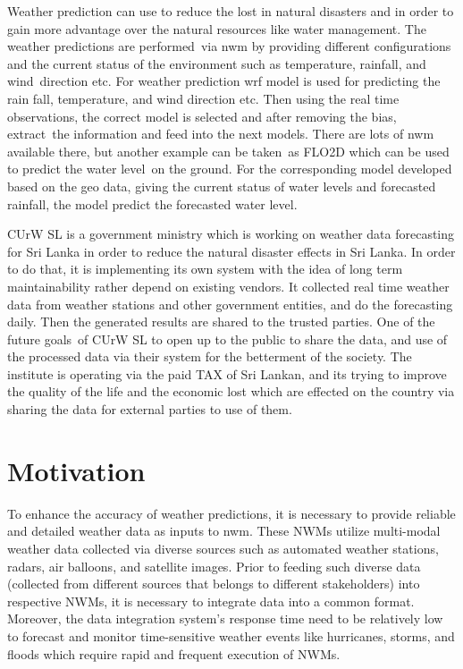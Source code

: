 Weather prediction can use to reduce the lost in natural disasters and in order to gain more advantage over the natural resources like water management. The weather predictions are performed via \acrfull{nwm} by providing different configurations and the current status of the environment such as temperature, rainfall, and wind direction etc. For weather prediction \acrfull{wrf} model is used for predicting the rain fall, temperature, and wind direction etc. Then using the real time observations, the correct model is selected and after removing the bias, extract the information and feed into the next models. There are lots of \acrshort{nwm} available there, but another example can be taken as FLO2D which can be used to predict the water level on the ground. For the corresponding model developed based on the geo data, giving the current status of water levels and forecasted rainfall, the model predict the forecasted water level.

CUrW SL is a government ministry which is working on weather data forecasting for Sri Lanka in order to reduce the natural disaster effects in Sri Lanka. In order to do that, it is implementing its own system with the idea of long term maintainability rather depend on existing vendors. It collected real time weather data from weather stations and other government entities, and do the forecasting daily. Then the generated results are shared to the trusted parties. One of the future goals of CUrW SL to open up to the public to share the data, and use of the processed data via their system for the betterment of the society. The institute is operating via the paid TAX of Sri Lankan, and its trying to improve the quality of the life and the economic lost which are effected on the country via sharing the data for external parties to use of them.

\section{Motivation}
To enhance the accuracy of weather predictions, it is necessary to provide reliable and detailed weather data as inputs to \acrfull{nwm}. These NWMs utilize multi-modal weather data collected via diverse sources such as automated weather stations, radars, air balloons, and satellite images. Prior to feeding such diverse data (collected from different sources that belongs to different stakeholders) into respective NWMs, it is necessary to integrate data into a common format. Moreover, the data integration system’s response time need to be relatively low to forecast and monitor time-sensitive weather events like hurricanes, storms, and floods which require rapid and frequent execution of NWMs.

